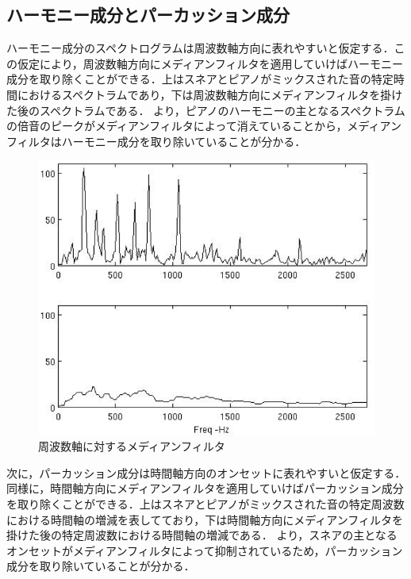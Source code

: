 \subsection{ハーモニー成分とパーカッション成分}
ハーモニー成分のスペクトログラムは周波数軸方向に表れやすいと仮定する．この仮定により，周波数軸方向にメディアンフィルタを適用していけばハーモニー成分を取り除くことができる．上はスネアとピアノがミックスされた音の特定時間におけるスペクトラムであり，下は周波数軸方向にメディアンフィルタを掛けた後のスペクトラムである．
より，ピアノのハーモニーの主となるスペクトラムの倍音のピークがメディアンフィルタによって消えていることから，メディアンフィルタはハーモニー成分を取り除いていることが分かる．
\begin{figure}[htbp]
	\begin{center}
		\includegraphics[scale=0.363]{./images/old-study/median-fre.png}
		\caption{周波数軸に対するメディアンフィルタ}
		\label{fig:median-fre}
	\end{center}
\end{figure}


次に，パーカッション成分は時間軸方向のオンセットに表れやすいと仮定する．同様に，時間軸方向にメディアンフィルタを適用していけばパーカッション成分を取り除くことができる．上はスネアとピアノがミックスされた音の特定周波数における時間軸の増減を表してており，下は時間軸方向にメディアンフィルタを掛けた後の特定周波数における時間軸の増減である．
より，スネアの主となるオンセットがメディアンフィルタによって抑制されているため，パーカッション成分を取り除いていることが分かる．

